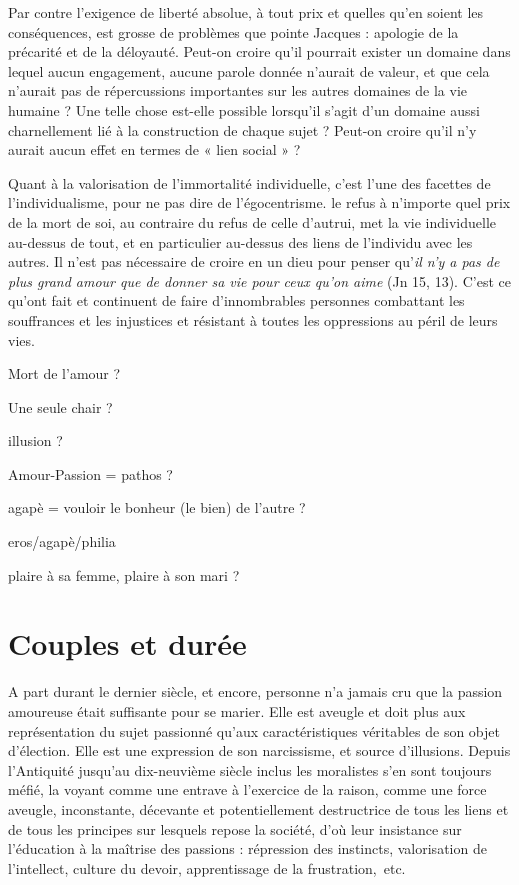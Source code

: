  Par contre l'exigence de liberté absolue, à tout prix et quelles qu'en soient les conséquences, est grosse de problèmes que pointe Jacques  : apologie de la précarité et de la déloyauté. Peut-on croire qu'il pourrait exister un domaine  dans lequel aucun engagement, aucune parole donnée n'aurait de valeur, et que cela n'aurait pas de répercussions importantes sur les autres domaines de la vie humaine ? Une telle chose est-elle possible lorsqu'il s'agit d'un domaine aussi charnellement lié à la construction de chaque sujet ? Peut-on croire qu'il n'y aurait aucun effet en termes de « lien social » ?
 
 Quant à la valorisation de l'immortalité individuelle, c'est l'une des facettes de l'individualisme, pour ne pas dire de l'égocentrisme.  le refus à n'importe quel prix de la mort de soi, au contraire du refus de celle d'autrui, met la vie individuelle au-dessus de tout, et en particulier au-dessus des liens de l'individu avec les autres. Il n'est pas nécessaire de croire en un dieu pour penser qu'\emph{il n'y a pas de plus grand amour que de donner sa vie pour ceux qu'on aime} (Jn 15, 13). C'est ce qu'ont fait et continuent de faire d'innombrables personnes combattant les souffrances et les injustices et résistant à toutes les oppressions au péril de leurs vies.
 
Mort de l'amour ? 

Une seule chair ? 

illusion ? 

Amour-Passion = pathos ?

agapè = vouloir le bonheur (le bien) de l'autre ? 

eros/agapè/philia

plaire à sa femme, plaire à son mari ?




 \chapter{Couples et durée}
 
 A part durant le dernier siècle, et encore, personne n'a jamais cru que la passion amoureuse était suffisante pour se marier. Elle est aveugle et doit plus aux représentation du sujet passionné qu'aux caractéristiques véritables de son objet d'élection. Elle est une expression de son narcissisme, et source d'illusions. Depuis l'Antiquité jusqu'au dix-neuvième siècle inclus les moralistes s'en sont toujours méfié, la voyant comme une entrave à l'exercice de la raison, comme une force aveugle, inconstante, décevante et potentiellement destructrice de tous les liens et de tous les principes sur lesquels repose la société, d'où leur insistance sur l'éducation à la maîtrise des passions : répression des instincts, valorisation de l'intellect, culture du devoir, apprentissage de la frustration,~etc.
 

